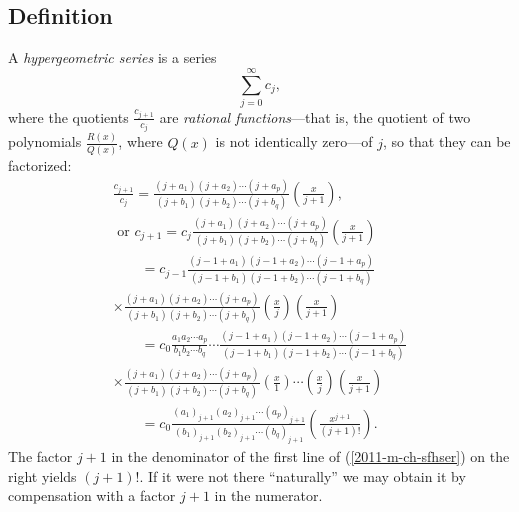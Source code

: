 \subsection{Definition}
A
{\em hypergeometric series}
is a series
\begin{equation}
\sum_{j=0}^\infty c_j ,
\label{2011-m-ch-sfhserd}
\end{equation}
where the quotients $\frac{c_{j+1}}{c_j}$ are {\em rational functions}---that is, the quotient of two polynomials
$\frac{R(x)}{Q(x)}$, where $Q(x)$ is not identically zero---of $j$, so that they can be factorized:
\begin{equation}
\begin{split}
\frac{c_{j+1}}{c_j}
=
\frac{(j+a_1)(j+a_2)\cdots (j+a_p)}{(j+b_1)(j+b_2)\cdots (j+b_q)}
\left(\frac{x}{j+1}\right),
\\
 \textrm{ or } c_{j+1}
=  c_j
\frac{(j+a_1)(j+a_2)\cdots (j+a_p)}{(j+b_1)(j+b_2)\cdots (j+b_q)}
\left(\frac{x}{j+1}\right)
\\
\qquad =
 c_{j-1}
\frac{(j-1+a_1)(j-1+a_2)\cdots (j-1+a_p)}{(j-1+b_1)(j-1+b_2)\cdots (j-1+b_q)}
\\
\times
\frac{(j+a_1)(j+a_2)\cdots (j+a_p)}{(j+b_1)(j+b_2)\cdots (j+b_q)}
\left(\frac{x}{j}\right)
\left(\frac{x}{j+1}\right)
\\
\qquad =
 c_{0}
\frac{a_1 a_2\cdots a_p}{b_1 b_2\cdots b_q}
\cdots
\frac{(j-1+a_1)(j-1+a_2)\cdots (j-1+a_p)}{(j-1+b_1)(j-1+b_2)\cdots (j-1+b_q)}
\\
\times
\frac{(j+a_1)(j+a_2)\cdots (j+a_p)}{(j+b_1)(j+b_2)\cdots (j+b_q)}
\left(\frac{x}{1}\right)
\cdots
\left(\frac{x}{j}\right)
\left(\frac{x}{j+1}\right)
\\
\qquad =
 c_{0}
\frac{(a_1)_{j+1}(a_2)_{j+1}\cdots (a_p)_{j+1}}{(b_1)_{j+1}(b_2)_{j+1}\cdots (b_q)_{j+1}}
\left(\frac{x^{j+1}}{(j+1)!}\right)
.
\end{split}
\label{2011-m-ch-sfhser}
\end{equation}
The factor $j+1$ in the denominator of the first  line of (\ref{2011-m-ch-sfhser})
on the right
yields $(j+1)!$.
If it were not there ``naturally''
we may obtain it by compensation with a factor $j+1$ in the numerator.

